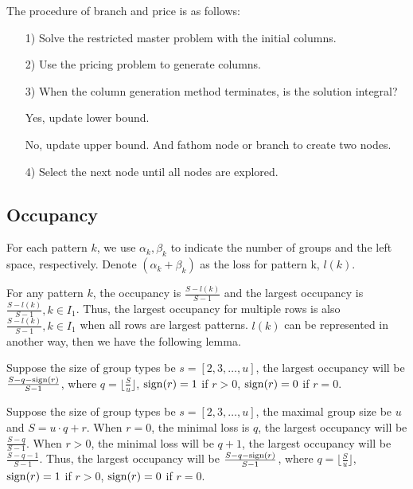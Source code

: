 The procedure of branch and price is as follows:

\begin{itemize}
  \item [1)] Solve the restricted master problem with the initial columns.
  \item [2)] Use the pricing problem to generate columns.
  \item [3)] When the column generation method terminates, is the solution integral?

  Yes, update lower bound.

  No, update upper bound. And fathom node or branch to create two nodes.

  \item [4)] Select the next node until all nodes are explored.
\end{itemize}


\subsection{Occupancy}

For each pattern $k$, we use $\alpha_k, \beta_k$ to indicate the number of groups and the left space, respectively. Denote $(\alpha_k + \beta_k)$ as the loss for pattern k, $l(k)$.

For any pattern $k$, the occupancy is $\frac{S-l(k)}{S-1}$ and the largest occupancy is $\frac{S-l(k)}{S-1}, k \in I_1$. Thus, the largest occupancy for
multiple rows is also $\frac{S-l(k)}{S-1}, k \in I_1$ when all rows are largest patterns. $l(k)$ can be represented in another way, then we have the following lemma.

\begin{lem}
Suppose the size of group types be $s = [2,3,\ldots,u]$, the largest occupancy will be $\frac{S-q-\operatorname{sign}(r)}{S-1}$, where $q = \lfloor \frac{S}{u} \rfloor$, $\operatorname{sign}(r)=1$ if $r >0$, $\operatorname{sign}(r)=0$ if $r =0$.
\end{lem}

Suppose the size of group types be $s = [2,3,\ldots,u]$, the maximal group size be $u$ and $S = u\cdot q + r$. When $r =0$, the minimal loss is $q$, the largest occupancy will be $\frac{S-q}{S-1}$.
When $r>0$, the minimal loss will be $q+1$, the largest occupancy will be $\frac{S-q-1}{S-1}$.
Thus, the largest occupancy will be $\frac{S-q-\operatorname{sign}(r)}{S-1}$, where $q = \lfloor \frac{S}{u} \rfloor$, $\operatorname{sign}(r)=1$ if $r >0$, $\operatorname{sign}(r)=0$ if $r =0$.


